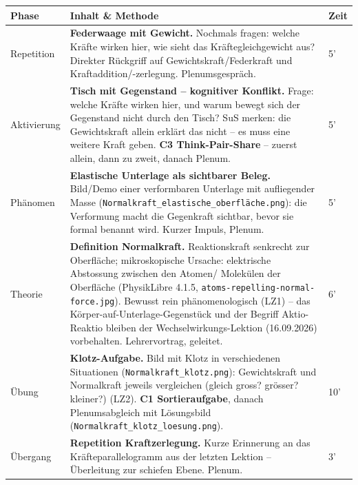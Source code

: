 \documentclass[11pt,a4paper]{article}
\newcommand{\Methode}[1]{{\small\color{groupteal}\textbf{#1}}}
\begin{document}
\begin{xltabular}{\textwidth}{@{}p{2.6cm}X p{1.2cm}@{}}
\toprule
\textbf{Phase} & \textbf{Inhalt \& Methode} & \textbf{Zeit} \\
\midrule
\endhead

Repetition &
\textbf{Federwaage mit Gewicht.} Nochmals fragen: welche Kräfte wirken
hier, wie sieht das Kräftegleichgewicht aus? Direkter Rückgriff auf
Gewichtskraft/Federkraft und Kraftaddition/-zerlegung. Plenumsgespräch. &
5' \\[0.4em]

Aktivierung &
\textbf{Tisch mit Gegenstand -- kognitiver Konflikt.} Frage: welche
Kräfte wirken hier, und warum bewegt sich der Gegenstand nicht durch den
Tisch? SuS merken: die Gewichtskraft allein erklärt das nicht -- es muss
eine weitere Kraft geben. \Methode{C3 Think-Pair-Share} -- zuerst allein,
dann zu zweit, danach Plenum. &
5' \\[0.4em]

Phänomen &
\textbf{Elastische Unterlage als sichtbarer Beleg.} Bild/Demo einer
verformbaren Unterlage mit aufliegender Masse
(\texttt{Normalkraft\_elastische\_oberfläche.png}): die Verformung macht
die Gegenkraft sichtbar, bevor sie formal benannt wird. Kurzer Impuls,
Plenum. &
5' \\[0.4em]

Theorie &
\textbf{Definition Normalkraft.} Reaktionskraft senkrecht zur Oberfläche;
mikroskopische Ursache: elektrische Abstossung zwischen den Atomen/
Molekülen der Oberfläche (PhysikLibre 4.1.5,
\texttt{atoms-repelling-normal-force.jpg}). Bewusst rein phänomenologisch
(LZ1) -- das Körper-auf-Unterlage-Gegenstück und der Begriff
Aktio-Reaktio bleiben der Wechselwirkungs-Lektion (16.09.2026)
vorbehalten. Lehrervortrag, geleitet. &
6' \\[0.4em]

Übung &
\textbf{Klotz-Aufgabe.} Bild mit Klotz in verschiedenen Situationen
(\texttt{Normalkraft\_klotz.png}): Gewichtskraft und Normalkraft jeweils
vergleichen (gleich gross? grösser? kleiner?) (LZ2). \Methode{C1
Sortieraufgabe}, danach Plenumsabgleich mit Lösungsbild
(\texttt{Normalkraft\_klotz\_loesung.png}). &
10' \\[0.4em]

Übergang &
\textbf{Repetition Kraftzerlegung.} Kurze Erinnerung an das
Kräfteparallelogramm aus der letzten Lektion -- Überleitung zur schiefen
Ebene. Plenum. &
3' \\[0.4em]


\end{xltabular}
\end{document}
